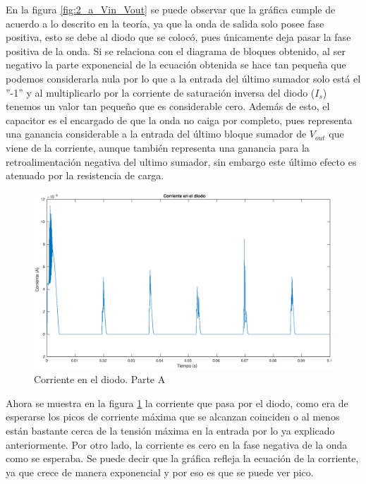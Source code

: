 \documentclass[12pt,letterpaper]{article}
\begin{document}
En la figura \ref{fig:2_a_Vin_Vout} se puede observar que la gráfica cumple de acuerdo a lo descrito en la teoría, ya que la onda de salida solo posee fase positiva, esto se debe al diodo que se colocó, pues únicamente deja pasar la fase positiva de la onda.
Si se relaciona con el diagrama de bloques obtenido, al ser negativo la parte exponencial de la ecuación obtenida  se hace tan pequeña que podemos considerarla nula por lo que a la entrada del último sumador solo está el ''-1'' y al multiplicarlo por la corriente de saturación inversa del diodo ($I_s$) tenemos un valor tan pequeño que es considerable cero. 
Además de esto, el capacitor es el encargado de que la onda no caiga por completo, pues representa una ganancia considerable a la entrada del último bloque sumador de $V_{out}$ que viene de la corriente, aunque también representa una ganancia para la retroalimentación negativa del ultimo sumador, sin embargo este último efecto es atenuado por la resistencia de carga.

\begin{figure}[ht!]
  \centering
  \includegraphics[width=0.8\linewidth]{pictures/Ejercicio2_a_corriente_diodo.eps}
  \caption{Corriente en el diodo. Parte A}
  \label{fig:2_a_Id}
\end{figure}

Ahora se muestra en la figura \ref{fig:2_a_Id} la corriente que pasa por el diodo, como era de esperarse los picos de corriente máxima que se alcanzan coinciden o al menos están bastante cerca de la tensión máxima en la entrada por lo ya explicado anteriormente. Por otro lado, la corriente es cero en la fase negativa de la onda como se esperaba. Se puede decir que la gráfica refleja la ecuación de la corriente, ya que crece de manera exponencial y por eso es que se puede ver pico.
\end{document}
